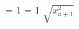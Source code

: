 \startTEXpage[offset=10pt]

    \ifdefined\tracingmath \tracingonline = 1 \tracingmath = 1 \fi $\sqrt{x^{2}_{a+1}} $

\stopTEXpage

